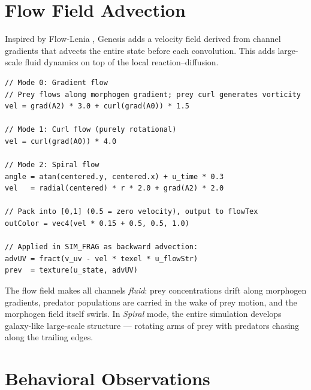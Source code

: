 \documentclass[11pt,a4paper]{article}
\begin{document}
\section{Flow Field Advection}

Inspired by Flow-Lenia \citep{plantec2022}, Genesis adds a velocity field
derived from channel gradients that advects the entire state before each
convolution. This adds large-scale fluid dynamics on top of the local
reaction--diffusion.

\begin{lstlisting}[language=pseudo, caption={\textsc{flow\_frag} --- three advection modes. The spiral mode produces galaxy-like large-scale structure.}]
// Mode 0: Gradient flow
// Prey flows along morphogen gradient; prey curl generates vorticity
vel = grad(A2) * 3.0 + curl(grad(A0)) * 1.5

// Mode 1: Curl flow (purely rotational)
vel = curl(grad(A0)) * 4.0

// Mode 2: Spiral flow
angle = atan(centered.y, centered.x) + u_time * 0.3
vel   = radial(centered) * r * 2.0 + grad(A2) * 2.0

// Pack into [0,1] (0.5 = zero velocity), output to flowTex
outColor = vec4(vel * 0.15 + 0.5, 0.5, 1.0)

// Applied in SIM_FRAG as backward advection:
advUV = fract(v_uv - vel * texel * u_flowStr)
prev  = texture(u_state, advUV)
\end{lstlisting}

The flow field makes all channels \emph{fluid}: prey concentrations drift
along morphogen gradients, predator populations are carried in the wake
of prey motion, and the morphogen field itself swirls. In \textit{Spiral}
mode, the entire simulation develops galaxy-like large-scale structure
--- rotating arms of prey with predators chasing along the trailing edges.

\section{Behavioral Observations}
\end{document}
